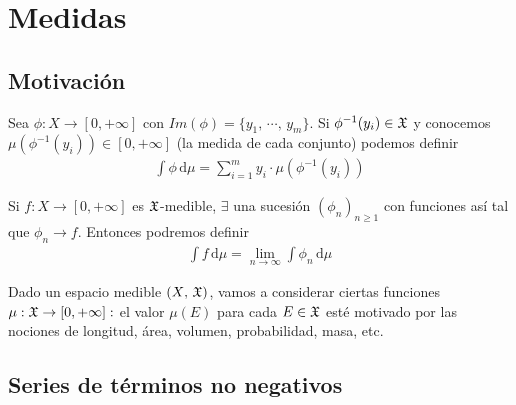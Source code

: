\section{Medidas}

\subsection{Motivación}
Sea $\phi: X \to [0, +\infty]$ con $Im(\phi) = \{ y_1\text{, } \cdots \text{, } y_m \}$. Si $\phi^{-1}(y_i) \in \mathfrak{X}$ y conocemos
$\mu(\phi^{-1}(y_i)) \in [0, +\infty]$ (la medida de cada conjunto) podemos definir \begin{align*}
    \int \phi \,\mathrm{d} \mu = \sum_{i=1}^m y_i \cdot \mu(\phi^{-1}(y_i))
\end{align*}

Si $f: X \to [0, +\infty]$ es $\mathfrak{X}$-medible, $\exists$ una sucesión $(\phi_n)_{n \geq 1}$ con funciones así tal que $\phi_n \to f$. Entonces podremos definir
\begin{align*}
    \int f \,\mathrm{d}\mu = \lim_{n \to \infty} \int \phi_n \,\mathrm{d}\mu
\end{align*}

Dado un espacio medible $(X\text{, } \mathfrak{X})$, vamos a considerar ciertas funciones $\mu : \mathfrak{X} \to [0, +\infty] : $ el valor $\mu(E)$ para cada $E \in \mathfrak{X}$
esté motivado por las nociones de longitud, área, volumen, probabilidad, masa, etc.

\clearpage

\subsection{Series de términos no negativos}

